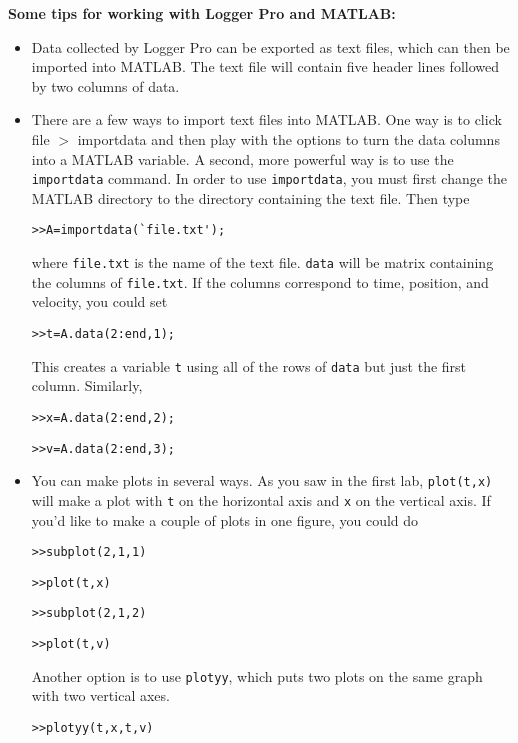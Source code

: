 \documentclass[11pt,letterpaper]{article}
\begin{document}
\textbf{Some tips for working with Logger Pro and MATLAB:}
\begin{itemize}
\item Data collected by Logger Pro can be exported as text files, which can then be imported into MATLAB. The text file will contain five header lines followed by two columns of data.

\item There are a few ways to import text files into MATLAB. One way is to click file $>$ importdata and then play with the options to turn the data columns into a MATLAB variable. A second, more powerful way is to use the \verb+importdata+ command. In order to use \verb+importdata+, you must first change the MATLAB directory to the directory containing the text file. Then type 
\begin{verbatim}>>A=importdata(`file.txt');\end{verbatim} 
where \verb+file.txt+ is the name of the text file. \verb+data+ will be matrix containing the columns of \verb+file.txt+. If the columns correspond to time, position, and velocity, you could set
\begin{verbatim}>>t=A.data(2:end,1);\end{verbatim}
This creates a variable \verb+t+ using all of the rows of \verb+data+ but just the first column. Similarly,
\begin{verbatim}>>x=A.data(2:end,2);\end{verbatim}
\begin{verbatim}>>v=A.data(2:end,3);\end{verbatim}

\item You can make plots in several ways. As you saw in the first lab, \verb+plot(t,x)+ will make a plot with \verb+t+ on the horizontal axis and \verb+x+ on the vertical axis. If you'd like to make a couple of plots in one figure, you could do
\begin{verbatim}>>subplot(2,1,1)\end{verbatim}
\begin{verbatim}>>plot(t,x)\end{verbatim}
\begin{verbatim}>>subplot(2,1,2)\end{verbatim}
\begin{verbatim}>>plot(t,v)\end{verbatim}
Another option is to use \verb+plotyy+, which puts two plots on the same graph with two vertical axes.
\begin{verbatim}>>plotyy(t,x,t,v)\end{verbatim}


\end{itemize}
\end{document}
